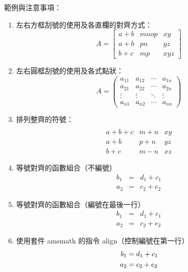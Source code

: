 範例與注意事項：
\begin{enumerate}
  \item 左右方框刮號的使用及各直欄的對齊方式：
        $$ A = \left[
            \begin{array}{clr}
                a+b & mnop  & xy \\
                a+b & pn    	& yz \\
                b+c & mp    	& xyz
            \end{array} \right] $$

  \item 左右圓框刮號的使用及各式點狀：
        $$ A=\left(
            \begin{array}{cccc}
                a_{11} 	& a_{12} & \cdots 	& a_{1n}\\
                a_{21} 	& a_{22} & \cdots 	& a_{2n}\\
                \vdots 	& \vdots & \ddots	& \vdots\\
                a_{n1} 	& a_{n2} & \cdots 	& a_{nn}
            \end{array} \right) $$

  \item 排列整齊的符號：
        $$ \begin{array}{clr}\\
            a+b+c   & m+n 	& xy \\
            a+b     	& p+n 	& yz \\
            b+c     	& m-n 	& xz
        \end{array} $$

    \item 等號對齊的函數組合（不編號）
        \begin{eqnarray*}
          b_1 &=& d_1+c_1 \\
          a_2 &=& c_2+e_2
        \end{eqnarray*}

    \item 等號對齊的函數組合（編號在最後一行）
        \begin{eqnarray}
\nonumber b_1 &=& d_1+c_1 \\
          a_2 &=& c_2+e_2
        \end{eqnarray}

    \item 使用套件 {\A amsmath} 的指令 {\A align}（控制編號在第一行）
        \begin{align}
            b_1 &= d_1+c_1\\
            a_2 &= c_2+e_2 \notag
        \end{align}


\end{enumerate}

